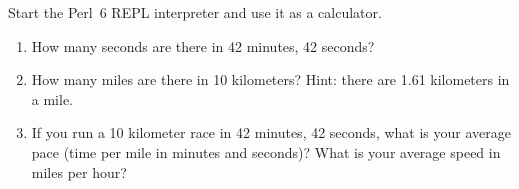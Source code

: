 \begin{exercise}

Start the Perl~6 REPL interpreter and use it as a calculator.

\begin{enumerate}

\item How many seconds are there in 42 minutes, 42 seconds?

\item How many miles are there in 10 kilometers?  Hint: there are 1.61
  kilometers in a mile.

\item If you run a 10 kilometer race in 42 minutes, 42 seconds, what is
  your average pace (time per mile in minutes and seconds)?  What is
  your average speed in miles per hour?


\end{enumerate}

\end{exercise}


